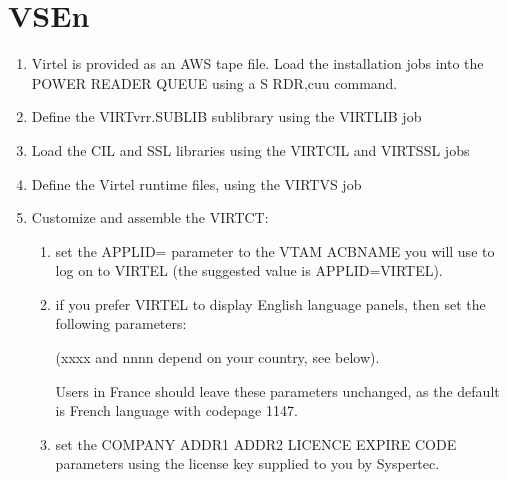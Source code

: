 \documentclass[letterpaper,10pt,english]{sphinxmanual}
\begin{document}
\section{VSEn}
\label{\detokenize{Getting_Started:vsen}}\begin{enumerate}
%
\item {} 
\sphinxAtStartPar
Virtel is provided as an AWS tape file. Load the installation jobs into the POWER READER QUEUE using a S RDR,cuu command.

\item {} 
\sphinxAtStartPar
Define the VIRTvrr.SUBLIB sublibrary using the VIRTLIB job

\item {} 
\sphinxAtStartPar
Load the CIL and SSL libraries using the VIRTCIL and VIRTSSL jobs

\item {} 
\sphinxAtStartPar
Define the Virtel runtime files, using the VIRTVS job

\item {} 
\sphinxAtStartPar
Customize and assemble the VIRTCT:
\begin{enumerate}
%
\item {} 
\sphinxAtStartPar
set the APPLID= parameter to the VTAM ACBNAME you will use to log on to VIRTEL (the suggested value is APPLID=VIRTEL).

\item {} 
\sphinxAtStartPar
if you prefer VIRTEL to display English language panels, then set the following parameters:

\begin{sphinxVerbatim}[commandchars=\\\{\}]
                                               
                                           
                                        
\end{sphinxVerbatim}

\sphinxAtStartPar
(xxxx and nnnn depend on your country, see below).

\sphinxAtStartPar
Users in France should leave these parameters unchanged, as the default is French language with codepage 1147.

\item {} 
\sphinxAtStartPar
set the COMPANY ADDR1 ADDR2 LICENCE EXPIRE CODE parameters using the license key supplied to you by Syspertec.


\end{enumerate}
\end{enumerate}
\end{document}
